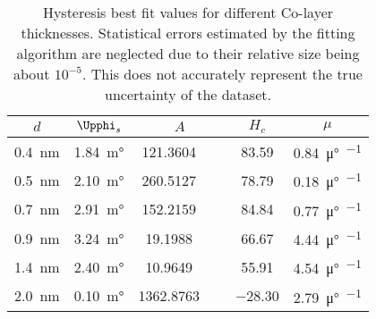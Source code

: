 \begingroup
\renewcommand{\arraystretch}{1.1}
\begin{table}
	\begin{center}
	\caption{Hysteresis best fit values for different Co-layer thicknesses. Statistical errors estimated by the fitting algorithm are neglected due to their relative size being about $10^{-5}$. This does not accurately represent the true uncertainty of the dataset.}
	\begin{tabular*}{\textwidth}{@{\extracolsep{\fill}} c|cccc}
  \toprule
	\hline
  $d$ & $\Upphi_s$ & $A$ & $H_c$ & $\mu$ \\
	\hline
	\SI{0.4}{\nano\meter} & \SI{1.84}{\milli\degree} & \SI{121.3604}{\per\milli\oersted} & \SI{83.59}{\oersted} & \SI{0.84}{\micro\degree\per\oersted} \\
	\SI{0.5}{\nano\meter} & \SI{2.10}{\milli\degree} & \SI{260.5127}{\per\milli\oersted} & \SI{78.79}{\oersted} & \SI{0.18}{\micro\degree\per\oersted} \\
	\SI{0.7}{\nano\meter} & \SI{2.91}{\milli\degree} & \SI{152.2159}{\per\milli\oersted} & \SI{84.84}{\oersted} & \SI{0.77}{\micro\degree\per\oersted} \\
	\SI{0.9}{\nano\meter} & \SI{3.24}{\milli\degree} & \SI{19.1988}{\per\milli\oersted} & \SI{66.67}{\oersted} & \SI{4.44}{\micro\degree\per\oersted} \\
	\SI{1.4}{\nano\meter} & \SI{2.40}{\milli\degree} & \SI{10.9649}{\per\milli\oersted} & \SI{55.91}{\oersted} & \SI{4.54}{\micro\degree\per\oersted} \\
	\SI{2.0}{\nano\meter} & \SI{0.10}{\milli\degree} & \SI{1362.8763}{\per\milli\oersted} & \SI{-28.30}{\oersted} & \SI{2.79}{\micro\degree\per\oersted} \\
	\hline
	\bottomrule
	\end{tabular*}
	\label{tab:fitvals-ferro}
	\end{center}
\end{table}
\endgroup
